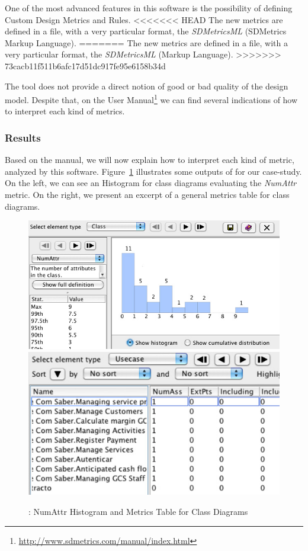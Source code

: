 One of the most advanced features in this software is the possibility of defining Custom Design Metrics and Rules. 
<<<<<<< HEAD
The new metrics are defined in a \xml file, with a very particular format, the \textit{SDMetricsML} (SDMetrics Markup Language).
=======
The new metrics are defined in a \xmlS file, with a very particular format, the \textit{SDMetricsML} (\sdmetricsS Markup Language).
>>>>>>> 73cacb11f511b6afc17d51dc917fe95e6158b34d

The \sdmetricsS tool does not provide a direct notion of good or bad quality of the design model. 
Despite that, on the \sdmetricsS User Manual\footnote{\url{http://www.sdmetrics.com/manual/index.html}} we can find several indications of how to interpret each kind of metrics. 
 
\subsubsection{Results}
Based on the \sdmetricsS manual, we will now explain how to interpret each kind of metric, analyzed by this software. 
Figure~\ref{fig:sdmetrics} illustrates some outputs of \sdmetricsS for our case-study. 
On the left, we can see an Histogram for class diagrams evaluating the \textit{NumAttr} metric. On the right, we present an excerpt of a general metrics table for class diagrams.

\begin{figure}[htbp]
\includegraphics[scale=0.3]{images/histogram2}
\hspace{0.1cm}
\includegraphics[scale=0.32]{images/table3}
\caption{\sdmetricsS: \textsf{NumAttr} Histogram and Metrics Table for Class Diagrams}
\label{fig:sdmetrics}
\end{figure}


